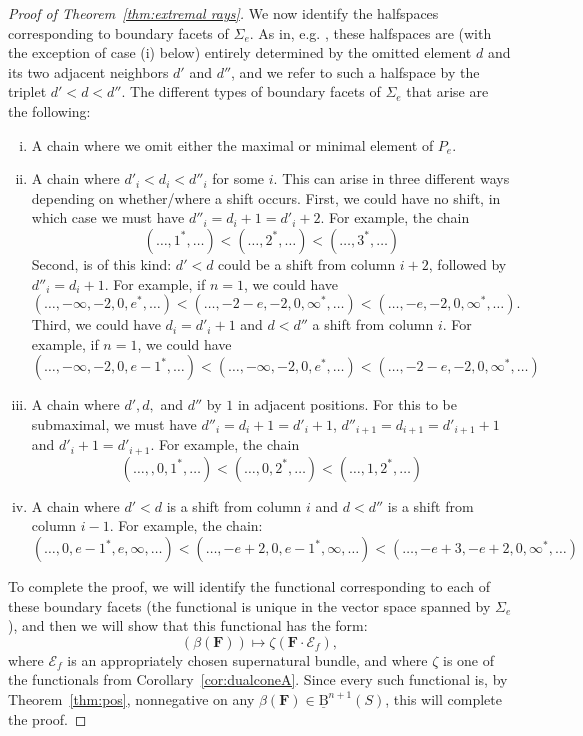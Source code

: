 \documentclass[12pt]{amsart}
\theoremstyle{definition}
\theoremstyle{remark}
\newcommand{\cE}{\mathcal{E}}
\newcommand{\FF}{\mathbf{F}}
\newcommand{\BBQ}{\underline{\mathrm{B}}}
\begin{document}
\begin{proof}[Proof of Theorem~\ref{thm:extremal rays}]
We now identify the halfspaces corresponding to boundary facets of $\Sigma_e$.  As in, e.g. \cite[Proposition~2.12]{boij-sod1}, these halfspaces are (with the exception of case (i) below) entirely determined by the omitted element $d$ and its two adjacent neighbors $d'$ and $d''$, and we refer to such a halfspace by the triplet $d'<d<d''$.  The different types of boundary facets of $\Sigma_e$ that arise are the following:
\begin{enumerate}[(i)]
	\item A chain where we omit either the maximal or minimal element of $P_e$.
	\item A chain where $d'_i<d_i<d''_i$ for some $i$.  This can arise in three different ways depending on whether/where a shift occurs.  First, we could have no shift, in which case we must have $d''_i=d_i+1=d'_i+2$.  For example, the chain
	\[
(\dots,1^*,\dots) <(\dots, 2^*,\dots) <(\dots,3^*,\dots)
	\]
Second, is of this kind: $d'<d$ could be a shift from column $i+2$, followed by $d''_i=d_i+1$.  For example, if $n=1$, we could have
	\[
	(\dots, -\infty, -2, 0, e^*, \dots)<(\dots, -2-e,-2, 0, \infty^*, \dots)<(\dots, -e,-2, 0, \infty^*, \dots).
	\]
Third, we could have $d_i=d'_i+1$ and $d<d''$ a shift from column $i$. For example, if $n=1$, we could have
	\[
	(\dots, -\infty, -2, 0, e-1^*, \dots)<(\dots, -\infty, -2, 0, e^*, \dots)<(\dots, -2-e,-2, 0, \infty^*, \dots)	\]
	\item A chain where $d', d,$ and $d''$ by $1$ in adjacent positions.  For this to be submaximal, we must have $d''_i=d_i+1=d'_i+1$, $d''_{i+1}=d_{i+1}=d'_{i+1}+1$ and $d'_i+1=d'_{i+1}$.  For example, the chain
			\[
(\dots,, 0,1^*,\dots) <(\dots, 0,2^*,\dots) <(\dots, 1,2^*,\dots) 
			\]
	\item A chain where $d'<d$ is a shift from column $i$ and $d<d''$ is a shift from column $i-1$.  For example, the chain:
		\[
		(\dots, 0,e-1^*,e,\infty,\dots)<(\dots, -e+2,0,e-1^*,\infty,\dots)<(\dots, -e+3,-e+2,0,\infty^*,\dots)
		\]
\end{enumerate} 

To complete the proof, we will identify the functional corresponding to each of these boundary facets (the functional is unique in the vector space spanned by $\Sigma_e$), and then we will show that this functional has the form:
\[
(\beta(\FF))\mapsto \zeta(\FF\cdot \cE_f),
\]
where $\cE_f$ is an appropriately chosen supernatural bundle, and where $\zeta$ is one of the functionals from Corollary~\ref{cor:dualconeA}.  Since every such functional is, by Theorem~\ref{thm:pos}, nonnegative on any $\beta(\FF)\in \BBQ^{n+1}(S)$, this will complete the proof.


\end{proof}
\end{document}
